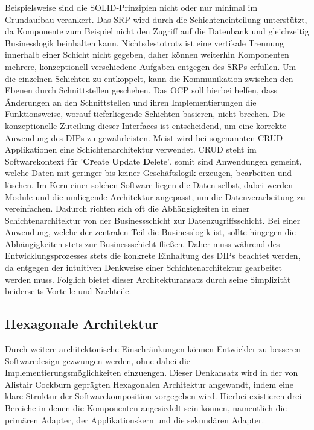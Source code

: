 Beispielsweise sind die SOLID-Prinzipien nicht oder nur minimal im Grundaufbau verankert. Das \acrlong{SRP} wird durch die Schichteneinteilung unterstützt, da Komponente zum Beispiel nicht den Zugriff auf die Datenbank und gleichzeitig Businesslogik beinhalten kann. Nichtsdestotrotz ist eine vertikale Trennung innerhalb einer Schicht nicht gegeben, daher können weiterhin Komponenten mehrere, konzeptionell verschiedene Aufgaben entgegen des SRPs erfüllen. Um die einzelnen Schichten zu entkoppelt, kann die Kommunikation zwischen den Ebenen durch Schnittstellen geschehen. Das \acrlong{OCP} soll hierbei helfen, dass Änderungen an den Schnittstellen und ihren Implementierungen die Funktionsweise, worauf tieferliegende Schichten basieren, nicht brechen. Die konzeptionelle Zuteilung dieser Interfaces ist entscheidend, um eine korrekte Anwendung des \acrlong{DIP}s zu gewährleisten. Meist wird bei sogenannten CRUD-Applikationen eine Schichtenarchitektur verwendet. CRUD steht im Softwarekontext für '\textbf{Cr}eate \textbf{U}pdate \textbf{D}elete', somit sind Anwendungen gemeint, welche Daten mit geringer bis keiner Geschäftslogik erzeugen, bearbeiten und löschen. Im Kern einer solchen Software liegen die Daten selbst, dabei werden Module und die umliegende Architektur angepasst, um die Datenverarbeitung zu vereinfachen. Dadurch richten sich oft die Abhängigkeiten in einer Schichtenarchitektur von der Businessschicht zur Datenzugriffsschicht. Bei einer Anwendung, welche der zentralen Teil die Businesslogik ist, sollte hingegen die Abhängigkeiten stets zur Businessschicht fließen. Daher muss während des Entwicklungsprozesses stets die konkrete Einhaltung des DIPs beachtet werden, da entgegen der intuitiven Denkweise einer Schichtenarchitektur gearbeitet werden muss. Folglich bietet dieser Architekturansatz durch seine Simplizität beiderseits Vorteile und Nachteile. 


\subsection{Hexagonale Architektur}


Durch weitere architektonische Einschränkungen können Entwickler zu besseren Softwaredesign gezwungen werden, ohne dabei die Implementierungsmöglichkeiten einzuengen. Dieser Denkansatz wird in der von Alistair Cockburn geprägten Hexagonalen Architektur angewandt, indem eine klare Struktur der Softwarekomposition vorgegeben wird. Hierbei existieren drei Bereiche in denen die Komponenten angesiedelt sein können, namentlich die primären Adapter, der Applikationskern und die sekundären Adapter. 

